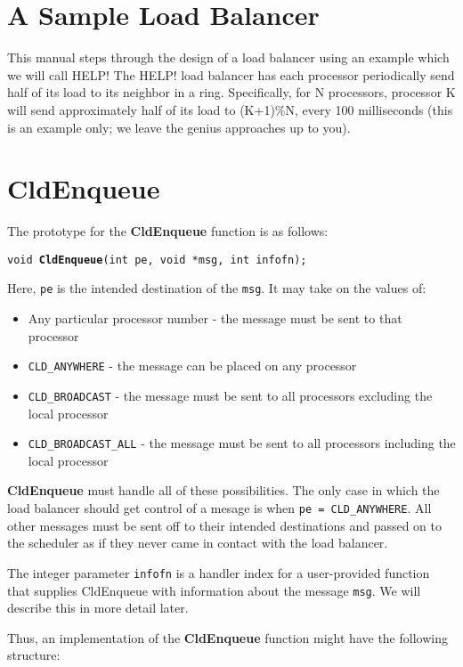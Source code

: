 \section{A Sample Load Balancer}

This manual steps through the design of a load balancer using an
example which we will call HELP!  The HELP! load balancer has each processor
periodically send half of its load to its neighbor in a ring.
Specifically, for N processors, processor K will send approximately half of
its load to (K+1)\%N, every 100 milliseconds (this is an example only;
we leave the genius approaches up to you).

\section{CldEnqueue}

The prototype for the {\bf CldEnqueue} function is as follows:

{\tt void {\bf CldEnqueue}(int pe, void *msg, int infofn);}

Here, {\tt pe} is the intended destination of the {\tt msg}.  It may
take on the values of:

\begin{itemize}
\item Any particular processor number - the message must be sent to
that processor
\item {\tt CLD\_ANYWHERE} - the message can be placed on any processor
\item {\tt CLD\_BROADCAST} - the message must be sent to all processors
excluding the local processor
\item {\tt CLD\_BROADCAST\_ALL} - the message must be sent to all processors
including the local processor
\end{itemize}

{\bf CldEnqueue} must handle all of these possibilities.  The only
case in which the load balancer should get control of a mesage is when
{\tt pe = CLD\_ANYWHERE}.  All other messages must be sent off to their
intended destinations and passed on to the scheduler as if they never
came in contact with the load balancer. 

The integer parameter {\tt infofn} is a handler index for a
user-provided function that supplies CldEnqueue with information about
the message {\tt msg}.  We will describe this in more detail later.

Thus, an implementation of the {\bf CldEnqueue} function might have
the following structure:

